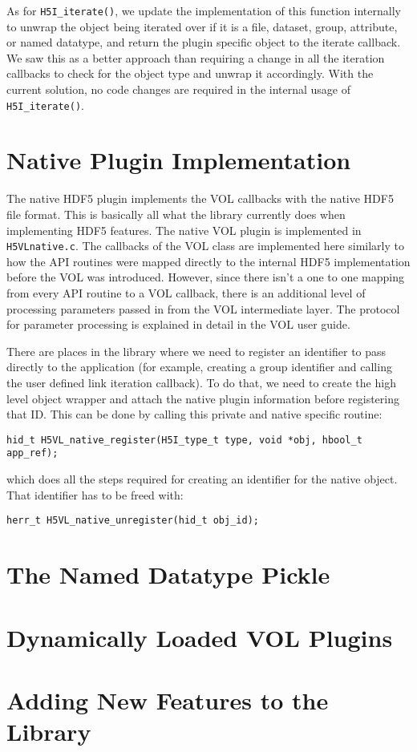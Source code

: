 As for {\tt H5I\_iterate()}, we update the implementation of this function internally to unwrap the object being iterated over if it is a file, dataset, group, attribute, or named datatype, and return the plugin specific object to the iterate callback. We saw this as a better approach than requiring a change in all the iteration callbacks to check for the object type and unwrap it accordingly. With the current solution, no code changes are required in the internal usage of {\tt H5I\_iterate()}.

\section{Native Plugin Implementation}
The native HDF5 plugin implements the VOL callbacks with the native HDF5 file format. This is basically all what the library currently does when implementing HDF5 features. The native VOL plugin is implemented in {\tt H5VLnative.c}. The callbacks of the VOL class are implemented here similarly to how the API routines were mapped directly to the internal HDF5 implementation before the VOL was introduced. However, since there isn't a one to one mapping from every API routine to a VOL callback, there is an additional level of processing parameters passed in from the VOL intermediate layer. The protocol for parameter processing is explained in detail in the VOL user guide.

There are places in the library where we need to register an identifier to pass directly to the application (for example, creating a group identifier and calling the user defined link iteration callback). To do that, we need to create the high level object wrapper and attach the native plugin information before registering that ID. This can be done by calling this private and native specific routine:
\begin{lstlisting}
hid_t H5VL_native_register(H5I_type_t type, void *obj, hbool_t app_ref);
\end{lstlisting}
which does all the steps required for creating an identifier for the native object. That identifier has to be freed with:
\begin{lstlisting}
herr_t H5VL_native_unregister(hid_t obj_id);
\end{lstlisting}

\section{The Named Datatype Pickle}

\section{Dynamically Loaded VOL Plugins}

\section{Adding New Features to the Library}